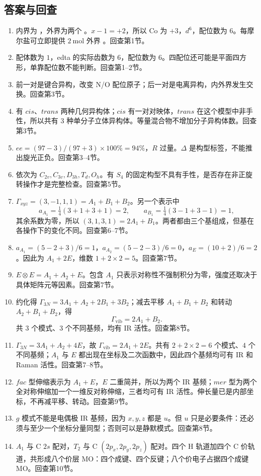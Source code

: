 \clearpage
\subsection*{答案与回查}
\begin{enumerate}[label=\textbf{\arabic*.},itemsep=0.65em]
\item 内界为 ，外界为两个 。$x-1=+2$，所以 Co 为 $+3$，$d^6$，配位数为 $6$。每摩尔盐可立即提供 $2\ \mathrm{mol}$ 外界 。\textcolor{Muted}{回查第1节。}
\item 配体数为 $1$，edta 的实际齿数为 $6$，配位数为 $6$。四配位还可能是平面四方形，单靠配位数不能判断。\textcolor{Muted}{回查第1--2节。}
\item 前一对是键合异构，改变 N/O 配位原子；后一对是电离异构，内外界发生交换。\textcolor{Muted}{回查第3节。}
\item 有 $cis$、$trans$ 两种几何异构体；$cis$ 有一对对映体，$trans$ 在这个模型中非手性，所以共有 $3$ 种单分子立体异构体。等量混合物不增加分子异构体数。\textcolor{Muted}{回查第3节。}
\item $ee=(97-3)/(97+3)\times100\%=94\%$，$R$ 过量。$\Delta$ 是构型标签，不能推出旋光正负。\textcolor{Muted}{回查第3--4节。}
\item 依次为 $C_{2v},C_{3v},D_{3h},T_d,O_h$。有 $S_4$ 的固定构型不具有手性，是否存在非正旋转操作才是完整检查。\textcolor{Muted}{回查第5节。}
\item $\Gamma_{xyz}=(3,-1,1,1)=A_1+B_1+B_2$。另一个表示中
\[
 a_{A_1}=\tfrac14(3+1+3+1)=2,\qquad
 a_{B_1}=\tfrac14(3-1+3-1)=1,
\]
其余系数为零，所以 $(3,1,3,1)=2A_1+B_1$。两者都由三个基组成，但基在各操作下的变化不同。\textcolor{Muted}{回查第6--7节。}
\item $a_{A_1}=(5-2+3)/6=1$，$a_{A_2}=(5-2-3)/6=0$，$a_E=(10+2)/6=2$。因此为 $A_1+2E$，维数 $1+2\times2=5$。\textcolor{Muted}{回查第7节。}
\item $E\otimes E=A_1+A_2+E$。包含 $A_1$ 只表示对称性不强制积分为零，强度还取决于具体矩阵元等因素。\textcolor{Muted}{回查第7节。}
\item 约化得 $\Gamma_{3N}=3A_1+A_2+2B_1+3B_2$；减去平移 $A_1+B_1+B_2$ 和转动 $A_2+B_1+B_2$，得
\[
 \Gamma_{\mathrm{vib}}=2A_1+B_2.
\]
共 $3$ 个模式、$3$ 个不同基频，均有 IR 活性。\textcolor{Muted}{回查第8节。}
\item $\Gamma_{3N}=3A_1+A_2+4E$，故 $\Gamma_{\mathrm{vib}}=2A_1+2E$。共有 $2+2\times2=6$ 个模式、$4$ 个不同基频；$A_1$ 与 $E$ 都出现在坐标及二次函数中，因此四个基频均可有 IR 和 Raman 活性。\textcolor{Muted}{回查第7--8节。}
\item $fac$ 型伸缩表示为 $A_1+E$，$E$ 二重简并，所以为两个 IR 基频；$mer$ 型为两个全对称伸缩加一个一维反对称伸缩，三者均可有 IR 活性。伸长量已是内部坐标，不再减平移、转动。\textcolor{Muted}{回查第9节。}
\item $g$ 模式不能是电偶极 IR 基频，因为 $x,y,z$ 都是 $u$。但 $u$ 只是必要条件：还必须与至少一个坐标分量同型；否则可以是静默模式。\textcolor{Muted}{回查第8节。}
\item $A_1$ 与 C $2s$ 配对，$T_2$ 与 C $(2p_x,2p_y,2p_z)$ 配对。四个 H 轨道加四个 C 价轨道，共形成八个价层 MO：四个成键、四个反键；八个价电子占据四个成键 MO。\textcolor{Muted}{回查第10节。}
\end{enumerate}

